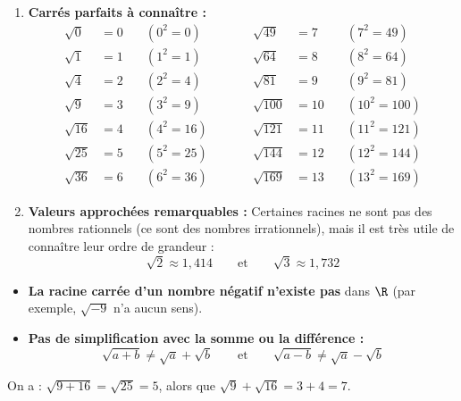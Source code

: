 \begin{ex}
	\nline
	\begin{enumerate}
		\item \textbf{Carrés parfaits à connaître :}
		      \[
			      \begin{array}{rllcrll}
				      \sqrt{0}  & = 0 & \quad (0^2 = 0)  & \qquad & \sqrt{49}  & = 7  & \quad (7^2 = 49)   \\
				      \sqrt{1}  & = 1 & \quad (1^2 = 1)  & \qquad & \sqrt{64}  & = 8  & \quad (8^2 = 64)   \\
				      \sqrt{4}  & = 2 & \quad (2^2 = 4)  & \qquad & \sqrt{81}  & = 9  & \quad (9^2 = 81)   \\
				      \sqrt{9}  & = 3 & \quad (3^2 = 9)  & \qquad & \sqrt{100} & = 10 & \quad (10^2 = 100) \\
				      \sqrt{16} & = 4 & \quad (4^2 = 16) & \qquad & \sqrt{121} & = 11 & \quad (11^2 = 121) \\
				      \sqrt{25} & = 5 & \quad (5^2 = 25) & \qquad & \sqrt{144} & = 12 & \quad (12^2 = 144) \\
				      \sqrt{36} & = 6 & \quad (6^2 = 36) & \qquad & \sqrt{169} & = 13 & \quad (13^2 = 169)
			      \end{array}
		      \]

		\item \textbf{Valeurs approchées remarquables :} Certaines racines ne sont pas des nombres rationnels (ce sont des nombres irrationnels), mais il est très utile de connaître leur ordre de grandeur :
		      \[
			      \sqrt{2} \approx 1{,}414 \qquad \text{et} \qquad \sqrt{3} \approx 1{,}732
		      \]
	\end{enumerate}
\end{ex}

\begin{attention}
	\nline
	\begin{itemize}
		\item \textbf{La racine carrée d'un nombre négatif n'existe pas} dans $\R$ (par exemple, $\sqrt{-9}$ n'a aucun sens).
		\item \textbf{Pas de simplification avec la somme ou la différence :}
		      \[
			      \sqrt{a + b} \neq \sqrt{a} + \sqrt{b} \qquad \text{et} \qquad \sqrt{a - b} \neq \sqrt{a} - \sqrt{b}
		      \]
	\end{itemize}

	On a : $\sqrt{9 + 16} = \sqrt{25} = 5$, alors que $\sqrt{9} + \sqrt{16} = 3 + 4 = 7$.
\end{attention}

